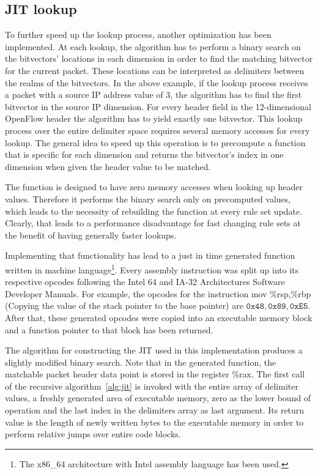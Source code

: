 \documentclass[a4paper,
		12pt,
		parskip=full,
		titlepage
		]{scrartcl}
\begin{document}
\subsection{JIT lookup}
To further speed up the lookup process, another optimization has been implemented.
At each lookup, the algorithm has to perform a binary search on the bitvectors' locations in each dimension in order to find the matching bitvector for the current packet.
These locations can be interpreted as delimiters between the realms of the bitvectors.
In the above example, if the lookup process receives a packet with a source IP address value of 3, the algorithm has to find the first bitvector in the source IP dimension. %
For every header field in the 12-dimensional OpenFlow header the algorithm has to yield exactly one bitvector.
This lookup process over the entire delimiter space requires several memory accesses for every lookup.
The general idea to speed up this operation is to precompute a function that is specific for each dimension and returns the bitvector's index in one dimension when given the header value to be matched.

The function is designed to have zero memory accesses when looking up header values.
Therefore it performs the binary search only on precomputed values, which 
leads to the necessity of rebuilding the function at every rule set update.
Clearly, that leads to a performance disadvantage for fast changing rule sets at the benefit of having generally faster lookups.

Implementing that functionality has lead to a just in time generated function written in machine 
language\footnote{The x86\_64 architecture with Intel assembly language has been used.}.
Every assembly instruction was split up into its respective opcodes following the 
Intel 64 and IA-32 Architectures Software Developer Manuals. %
For example, the opcodes for the instruction 
\textsf{mov \%rsp,\%rbp} (Copying the value of the stack pointer to the base pointer) 
are $\texttt{0x48}, \texttt{0x89}, \texttt{0xE5}$.
After that, these generated opcodes were copied into an executable memory block and a function pointer to that block has been returned.

The algorithm for constructing the JIT used in this implementation produces a slightly modified binary search.
Note that in the generated function, the matchable packet header data point is stored in the register \textsf{\%rax}.
The first call of the recursive algorithm~\ref{alg:jit} is invoked with the entire array of delimiter values, a freshly generated area of executable memory, 
zero as the lower bound of operation and the last index in the delimiters array as last argument.
Its return value is the length of newly written bytes to the executable memory in order to perform relative jumps over entire code blocks.
\end{document}
